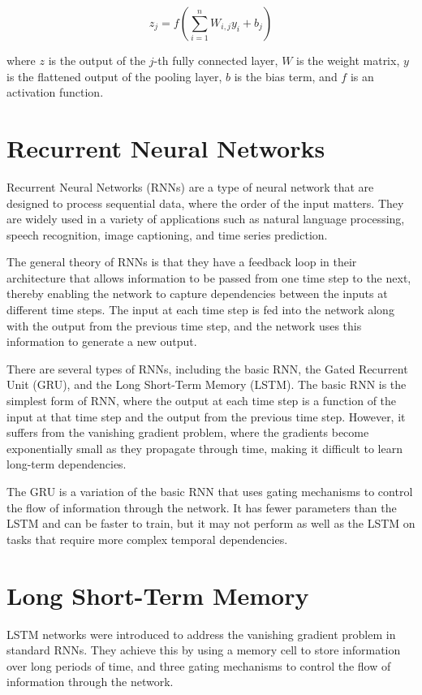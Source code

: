 $$z_j = f(\sum_{i=1}^n W_{i,j} y_i + b_j)$$

where $z$ is the output of the $j$-th fully connected layer, $W$ is the weight matrix, $y$ is the flattened output of the pooling layer, $b$ is the bias term, and $f$ is an activation function. 

\section{Recurrent Neural Networks}
\label{sec:3_rnns}

Recurrent Neural Networks (RNNs) are a type of neural network that are designed to process sequential data, where the order of the input matters. They are widely used in a variety of applications such as natural language processing, speech recognition, image captioning, and time series prediction.

The general theory of RNNs is that they have a feedback loop in their architecture that allows information to be passed from one time step to the next, thereby enabling the network to capture dependencies between the inputs at different time steps. The input at each time step is fed into the network along with the output from the previous time step, and the network uses this information to generate a new output.

There are several types of RNNs, including the basic RNN, the Gated Recurrent Unit (GRU), and the Long Short-Term Memory (LSTM). The basic RNN is the simplest form of RNN, where the output at each time step is a function of the input at that time step and the output from the previous time step. However, it suffers from the vanishing gradient problem, where the gradients become exponentially small as they propagate through time, making it difficult to learn long-term dependencies.

The GRU is a variation of the basic RNN that uses gating mechanisms to control the flow of information through the network. It has fewer parameters than the LSTM and can be faster to train, but it may not perform as well as the LSTM on tasks that require more complex temporal dependencies.

\section{Long Short-Term Memory}
\label{sec:3_LSTMs}

LSTM networks were introduced to address the vanishing gradient problem in standard RNNs. They achieve this by using a memory cell to store information over long periods of time, and three gating mechanisms to control the flow of information through the network.

